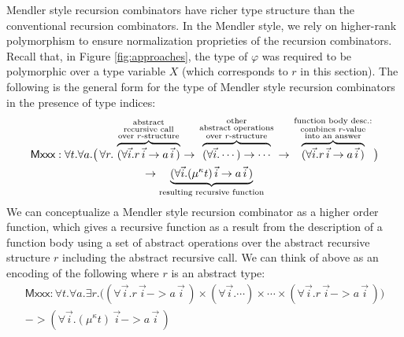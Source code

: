 Mendler style recursion combinators have richer type structure than the
conventional recursion combinators. In the Mendler style, we rely on
higher-rank polymorphism to ensure normalization proprieties of the
recursion combinators. Recall that, in Figure \ref{fig:approaches},
the type of $\varphi$ was required to be polymorphic over a type variable
$X$ (which corresponds to $r$ in this section).
The following is the general form for the type of Mendler style
recursion combinators in the presence of type indices:
\begin{multline*}
 \textsf{Mxxx} : \forall t . \forall a .
   \big(\, \forall r . \;
      \overset{\begin{smallmatrix}
                        \text{abstract} \\
                        \text{recursive call} \\
                        \text{over $r$-structure}
                       \end{smallmatrix}}{\overbrace{
            (\forall\vec{i} . r\,\vec{i} -> a\,\vec{i}\,) }}
   -> \overset{\begin{smallmatrix}
                        \text{other} \\
                        \text{abstract operations} \\
                        \text{over $r$-structure}
                       \end{smallmatrix}}{\overbrace{
            (\forall\vec{i} . \cdots) -> \cdots }}
   -> \overset{\begin{smallmatrix}
                        \text{function body desc.:} \\
                        \text{combines $r$-value} \\
                        \text{into an answer}
                       \end{smallmatrix}}{\overbrace{
            (\forall\vec{i} . r\,\vec{i}  -> a\,\vec{i}\,) }}
   \big) \\
 -> \underset{\text{resulting recursive function}}{\underbrace{
       (\forall\vec{i} . (\mu^\kappa t)\,\vec{i} -> a\,\vec{i}\,) }}
\end{multline*}
We can conceptualize a Mendler style recursion combinator as a higher order
function, which gives a recursive function as a result
from the description of a function body using a set of abstract operations
over the abstract recursive structure $r$ including the abstract recursive call.
We can think of above as an encoding of the following
where $r$ is an abstract type:
\begin{multline*}
 \textsf{Mxxx} : \forall t . \forall a .
 \exists r.
  \big(  (\forall\vec{i} . r\,\vec{i} -> a\,\vec{i}\,)
   \times (\forall\vec{i} . \cdots) \times \cdots
   \times (\forall\vec{i} . r\,\vec{i} -> a\,\vec{i}\,)
   \big) \\
 -> (\forall\vec{i} . (\mu^\kappa t)\,\vec{i} -> a\,\vec{i}\,)
\end{multline*}
